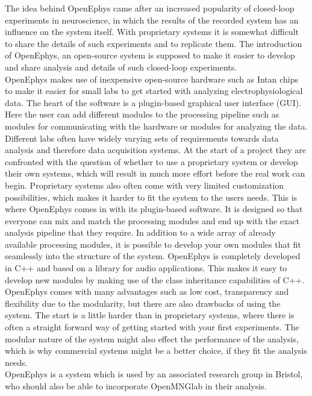 The idea behind OpenEphys came after an increased popularity of closed-loop experiments in neuroscience, in which the results of the recorded system has an influence on the system itself. With proprietary systems it is somewhat difficult to share the details of such experiments and to replicate them. The introduction of OpenEphys, an open-source system is supposed to make it easier to develop and share analysis and details of such closed-loop experiments.\\
OpenEphys makes use of inexpensive open-source hardware such as Intan chips~\cite{openEphys} to make it easier for small labs to get started with analyzing electrophysiological data. The heart of the software is a plugin-based graphical user interface (GUI). Here the user can add different modules to the processing pipeline such as modules for communicating with the hardware or modules for analyzing the data.\\
Different labs often have widely varying sets of requirements towards data analysis and therefore data acquisition systems. At the start of a project they are confronted with the question of whether to use a proprietary system or develop their own systems, which will result in much more effort before the real work can begin. Proprietary systems also often come with very limited customization possibilities, which makes it harder to fit the system to the users needs. This is where OpenEphys comes in with its plugin-based software. It is designed so that everyone can mix and match the processing modules and end up with the exact analysis pipeline that they require. In addition to a wide array of already available processing modules, it is possible to develop your own modules that fit seamlessly into the structure of the system. OpenEphys is completely developed in C++ and based on a library for audio applications. This makes it easy to develop new modules by making use of the class inheritance capabilities of C++.\\
OpenEphys comes with many advantages such as low cost, transparency and flexibility due to the modularity, but there are also drawbacks of using the system. The start is a little harder than in proprietary systems, where there is often a straight forward way of getting started with your first experiments. The modular nature of the system might also effect the performance of the analysis, which is why commercial systems might be a better choice, if they fit the analysis needs.\\
OpenEphys is a system which is used by an associated research group in Bristol, who should also be able to incorporate OpenMNGlab in their analysis.

